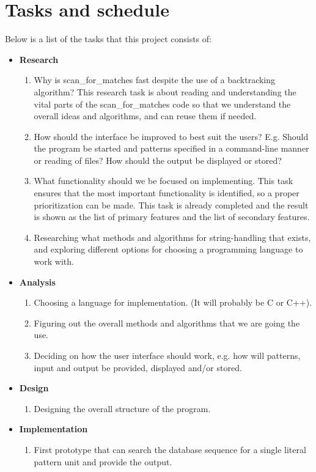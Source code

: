 \documentclass[12pt]{article}
\begin{document}
\section{Tasks and schedule}
Below is a list of the tasks that this project consists of:
\begin{itemize}
\item \textbf{Research} 
\begin{enumerate}
\item Why is scan\_for\_matches fast despite the use of a backtracking algorithm? This research task is about 
reading and understanding the vital parts of the scan\_for\_matches code so that we understand the overall
ideas and algorithms, and can reuse them if needed.
\item How should the interface be improved to best suit the users? E.g. Should the program be started and
patterns specified in a command-line manner or reading of files? How should the output be displayed or stored?
\item What functionality should we be focused on implementing. This task ensures that the most important functionality is 
identified, so a proper prioritization can be made. This task is already completed and the result is shown as the list
of primary features and the list of secondary features.
\item Researching what methods and algorithms for string-handling that exists, and exploring different options for 
choosing a programming language to work with.
\end{enumerate}
\item \textbf{Analysis}
\begin{enumerate}
\item Choosing a language for implementation. (It will probably be C or C++).
\item Figuring out the overall methods and algorithms that we are going the use.
\item Deciding on how the user interface should work, e.g. how will patterns, input and output be provided, displayed 
and/or stored.
\end{enumerate}
\item \textbf{Design}
\begin{enumerate}
\item Designing the overall structure of the program.
\end{enumerate}
\item \textbf{Implementation}
\begin{enumerate}
\item First prototype that can search the database sequence for a single literal pattern unit and provide the output.

\end{enumerate}
\end{itemize}
\end{document}
